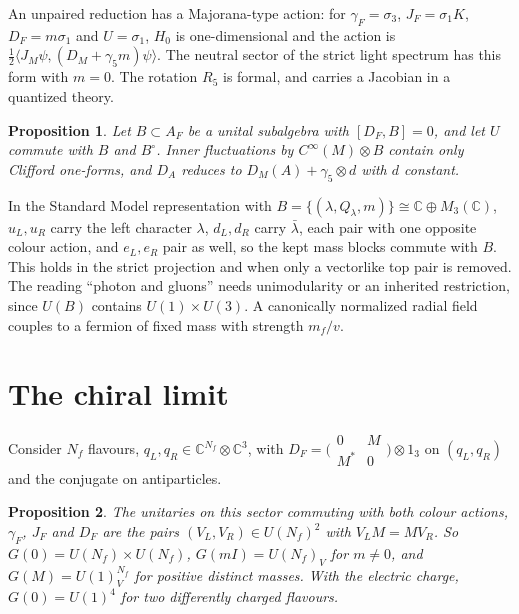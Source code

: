 \documentclass[aps,prd,reprint,onecolumn,nofootinbib,amsmath,amssymb,floatfix]{revtex4-2}
\theoremstyle{plain}
\newtheorem{proposition}{Proposition}
\newcommand{\C}{\mathbb C}
\begin{document}
An unpaired reduction has a Majorana-type action: for $\gamma_F=\sigma_3$, $J_F=\sigma_1K$, $D_F=m\sigma_1$ and $U=\sigma_1$, $H_0$ is one-dimensional and the action is $\tfrac12\langle J_M\psi,(D_M+\gamma_5m)\psi\rangle$. The neutral sector of the strict light spectrum has this form with $m=0$. The rotation $R_5$ is formal, and carries a Jacobian in a quantized theory.

\begin{proposition}
Let $B\subset A_F$ be a unital subalgebra with $[D_F,B]=0$, and let $U$ commute with $B$ and $B^\circ$. Inner fluctuations by $C^\infty(M)\otimes B$ contain only Clifford one-forms, and $D_A$ reduces to $D_M(A)+\gamma_5\otimes d$ with $d$ constant.
\end{proposition}

In the Standard Model representation with $B=\{(\lambda,Q_\lambda,m)\}\cong\C\oplus M_3(\C)$, $u_L,u_R$ carry the left character $\lambda$, $d_L,d_R$ carry $\bar\lambda$, each pair with one opposite colour action, and $e_L,e_R$ pair as well, so the kept mass blocks commute with $B$. This holds in the strict projection and when only a vectorlike top pair is removed. The reading ``photon and gluons'' needs unimodularity or an inherited restriction, since $U(B)$ contains $U(1)\times U(3)$. A canonically normalized radial field couples to a fermion of fixed mass with strength $m_f/v$.

\section{The chiral limit}

Consider $N_f$ flavours, $q_L,q_R\in\C^{N_f}\otimes\C^3$, with $D_F=\bigl(\begin{smallmatrix}0&M\\M^*&0\end{smallmatrix}\bigr)\otimes1_3$ on $(q_L,q_R)$ and the conjugate on antiparticles.

\begin{proposition}
The unitaries on this sector commuting with both colour actions, $\gamma_F$, $J_F$ and $D_F$ are the pairs $(V_L,V_R)\in U(N_f)^2$ with $V_LM=MV_R$. So $G(0)=U(N_f)\times U(N_f)$, $G(mI)=U(N_f)_V$ for $m\ne0$, and $G(M)=U(1)^{N_f}_V$ for positive distinct masses. With the electric charge, $G(0)=U(1)^4$ for two differently charged flavours.
\end{proposition}
\end{document}

